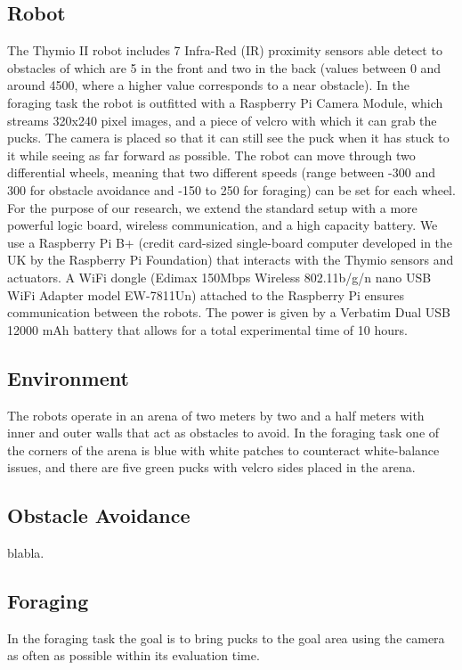 \documentclass{article}
\begin{document}
	\subsection{Robot} %
	\label{sub:Robot}
	The Thymio II robot includes 7 Infra-Red (IR) proximity sensors able detect
	to obstacles of which are 5 in the front and two in the back (values
	between 0 and around 4500, where a higher value corresponds to a near
	obstacle).
	In the foraging task the robot is outfitted with a Raspberry Pi Camera
	Module, which streams 320x240 pixel images, and a piece of velcro with
	which it can grab the pucks. The camera is placed so that it can still see
	the puck when it has stuck to it while seeing as far forward as possible.
	The robot can move through two differential wheels, meaning that two
	different speeds (range between -300 and 300 for obstacle avoidance and
	-150 to 250 for foraging) can be set for each wheel. For the purpose of our
	research, we extend the standard setup with a more powerful logic board,
	wireless communication, and a high capacity battery. We use a Raspberry Pi
	B+ (credit card-sized single-board computer developed in the UK by the
	Raspberry Pi Foundation) that interacts with the Thymio sensors and
	actuators. A WiFi dongle (Edimax 150Mbps Wireless 802.11b/g/n nano USB WiFi
	Adapter model EW-7811Un) attached to the Raspberry Pi ensures communication
	between the robots. The power is given by a Verbatim Dual USB 12000 mAh
	battery that allows for a total experimental time of 10 hours.

	\subsection{Environment} %
	\label{sub:Environment}
	The robots operate in an arena of two meters by two and a half meters with
	inner and outer walls that act as obstacles to avoid.
	In the foraging task one of the corners of the arena is blue with white
	patches to counteract white-balance issues, and there are five green pucks
	with velcro sides placed in the arena.

	\subsection{Obstacle Avoidance} %
	\label{sub:Obstacle Avoidance}
	blabla.

	\subsection{Foraging} %
	\label{sub:Foraging}
	In the foraging task the goal is to bring pucks to the goal area using the
	camera as often as possible within its evaluation time.
\end{document}

